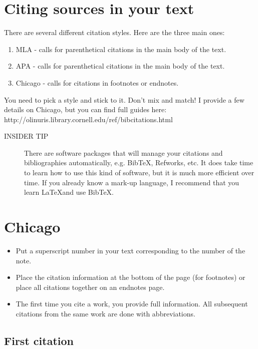 \documentclass[oneside]{article}
\begin{document}
\thispagestyle{fancy}

\section{Citing sources in your text}
There are several different citation styles. Here are the three main ones: 
\begin{enumerate}
\item MLA - calls for parenthetical citations in the main body of the text.
\item APA - calls for parenthetical citations in the main body of the text. 
\item Chicago - calls for citations in footnotes or endnotes. 
\end{enumerate}
You need to pick a style and stick to it. Don't mix and match!  I provide a few details on Chicago, but you can find full guides here:\\ http://olinuris.library.cornell.edu/ref/bibcitations.html
\begin{description}
\item[INSIDER TIP] There are software packages that will manage your citations and bibliographies automatically, e.g. BibTeX, Refworks, etc. It does take time to learn how to use this kind of software, but it is much more efficient over time. If you already know a mark-up language, I recommend that you learn \LaTeX and use BibTeX. 
\end{description}

\section{Chicago}
\begin{itemize}
\item Put a superscript number in your text corresponding to the number of the note. 
\item Place the citation information at the bottom of the page (for footnotes) or place all citations together on an endnotes page.
\item The first time you cite a work, you provide full information. All subsequent citations from the same work are done with abbreviations.
\end{itemize}

\subsection{First citation} 
\end{document}
